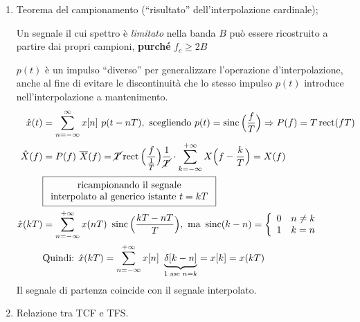 \documentclass[
]{article}
\begin{document}
\begin{enumerate}
\def\labelenumi{\arabic{enumi}.}
\setcounter{enumi}{10}
\item
  Teorema del campionamento (``risultato'' dell'interpolazione
  cardinale);

  Un segnale il cui spettro è \emph{limitato} nella banda \(B\) può
  essere ricostruito a partire dai propri campioni, \textbf{purché}
  \(f_c \geq 2B\)

  \(p(t)\) è un impulso ``diverso'' per generalizzare l'operazione
  d'interpolazione, anche al fine di evitare le discontinuità che lo
  stesso impulso \(p(t)\) introduce nell'interpolazione a mantenimento.
  \begin{align*}
  \hat{x}(t)&= \sum_{n=-\infty}^{\infty} x[n] \ p(t-nT), \ \text{scegliendo } p(t)= \mathop{\mathrm{sinc}}\Big(\frac{f}{T}\Big) \Rightarrow P(f)=T\mathop{\mathrm{rect}}(fT) \\ 
  \hat{X}(f)&= P(f) \ \overline{X}(f) = \cancel{T}\mathop{\mathrm{rect}}\Big(\frac{f}{\frac{1}{T}}\Big)\frac{1}{\cancel{T}}\cdot  \sum_{k=-\infty}^{+\infty} X\Big(f-\frac{k}{T}\Big)= X(f) \\
     &\boxed{\begin{array}{cl}
    \text{ricampionando il segnale}
    \\
     \text{interpolato al generico istante } t=kT
    \end{array}}&
    \\
  \hat{x}(kT) &=\sum_{n=-\infty}^{+\infty} x(nT) \ \mathop{\mathrm{sinc}}\Big(\frac{kT-nT}{T}\Big), \text{ ma } \mathop{\mathrm{sinc}}(k-n)=
  \left\{ \begin{array}{cl}
  0 & n\neq k \\
  1 & k=n
  \end{array} 
  \right. \\
  &\text{Quindi: } \hat{x}(kT)=\sum_{n=-\infty}^{+\infty}x[n] \ \underbrace{\delta[k-n]}_{1\text{ sse }n=k}= x[k] = x(kT)
  \end{align*} Il segnale di partenza coincide con il segnale
  interpolato.
\item
  Relazione tra TCF e TFS.


\end{enumerate}
\end{document}
